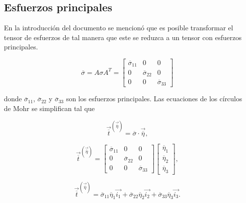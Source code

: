 \documentclass{article}
\begin{document}
    \subsection{Esfuerzos principales}

    En la introducci\'{o}n del documento se mencion\'{o} que es posible transformar el
    tensor de esfuerzos de tal manera que este se reduzca a un tensor con esfuerzos principales.

    \begin{equation}
        \overline{\sigma} = A \sigma A^{T} = 
        \begin{bmatrix}
            \overline{\sigma}_{11} & 0 & 0\\
            0 & \overline{\sigma}_{22} & 0\\
            0 & 0 & \overline{\sigma}_{33}
        \end{bmatrix}
    \end{equation}

    donde $\overline{\sigma}_{11}$, $\overline{\sigma}_{22}$ y $\overline{\sigma}_{33}$ son los esfuerzos
    principales.
    Las ecuaciones de los c\'{i}rculos de Mohr se simplifican tal que

    \begin{equation}
        \vec{\overline{t}}^{(\vec{\overline{\eta}})} = \overline{\sigma} \cdot \vec{\overline{\eta}},
    \end{equation}

    \begin{equation}
        \vec{\overline{t}}^{(\vec{\overline{\eta}})} =
        \begin{bmatrix}
            \overline{\sigma}_{11} & 0 & 0\\
            0 & \overline{\sigma}_{22} & 0\\
            0 & 0 & \overline{\sigma}_{33}
        \end{bmatrix}
        \begin{bmatrix}
            \overline{\eta}_{1} \\
            \overline{\eta}_{2} \\
            \overline{\eta}_{3}
        \end{bmatrix},
    \end{equation}

    \begin{equation}
        \vec{\overline{t}}^{(\vec{\overline{\eta}})} =
        \overline{\sigma}_{11}\overline{\eta}_{1}\vec{i_{1}} +
        \overline{\sigma}_{22}\overline{\eta}_{2}\vec{i_{2}} +
        \overline{\sigma}_{33}\overline{\eta}_{3}\vec{i_{3}}.
    \end{equation}
\end{document}
